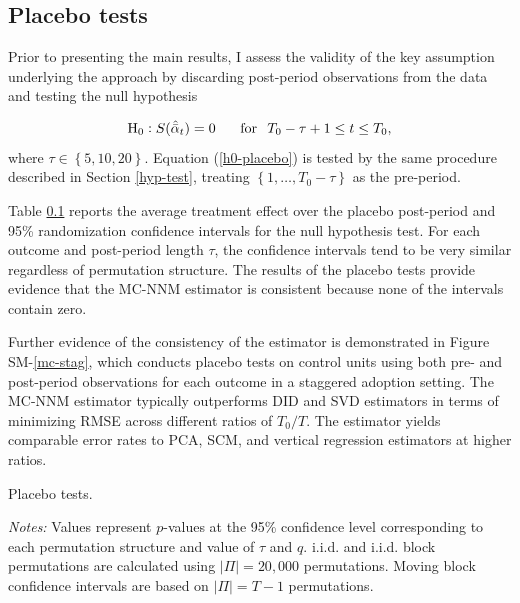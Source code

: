 \documentclass[12pt]{article}
\begin{document}
\subsection{Placebo tests} \label{placebo-tests}

Prior to presenting the main results, I assess the validity of the key assumption underlying the approach by discarding post-period observations from the data and testing the null hypothesis 

\begin{equation} \label{h0-placebo}
\text{H}_0: S (\hat{\bar{\alpha}}_{t}) = 0  \, \hspace{5mm} \,  \text{for} \, \hspace{2mm} T_0 - \tau +1 \leq t \leq T_0,
\end{equation}
where $\tau \in \left\{5, 10, 20\right\}$. Equation (\ref{h0-placebo}) is tested by the same procedure described in Section \ref{hyp-test}, treating $\left\{1, \ldots, T_0 - \tau\right\}$ as the pre-period.

Table \ref{placebo-tests} reports the average treatment effect over the placebo post-period and 95\% randomization confidence intervals for the null hypothesis test. For each outcome and post-period length $\tau$, the confidence intervals tend to be very similar regardless of permutation structure. The results of the placebo tests provide evidence that the MC-NNM estimator is consistent because none of the intervals contain zero. 

Further evidence of the consistency of the estimator is demonstrated in Figure SM-\ref{mc-stag}, which conducts placebo tests on control units using both pre- and post-period observations for each outcome in a staggered adoption setting. The MC-NNM estimator typically outperforms DID and SVD estimators in terms of minimizing RMSE across different ratios of $T_0/T$. The estimator yields comparable error rates to PCA, SCM, and vertical regression estimators at higher ratios. 

\begin{table}[htbp]
	\captionsetup{font=normalsize}
	\caption{Placebo tests.\label{placebo-tests}}
	\begin{center}
	
	\end{center}
	\footnotesize{\emph{Notes:} Values represent $p$-values at the 95\% confidence level corresponding to each permutation structure and value of $\tau$ and $q$. i.i.d. and i.i.d. block permutations are calculated using $|\Pi| = 20,000$ permutations. Moving block confidence intervals are based on $|\Pi| = T-1$ permutations.}
\end{table}
\end{document}
